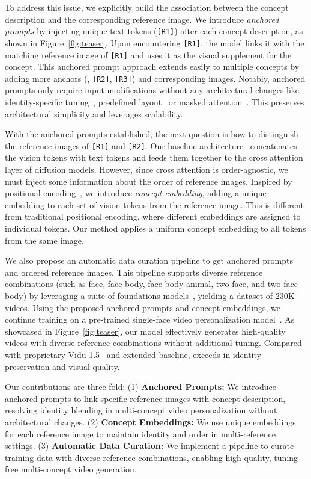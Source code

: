 To address this issue, we explicitly build the association between the concept description and the corresponding reference image. 
We introduce \emph{anchored prompts} by injecting unique text tokens (\texttt{[R1]}) after each concept description, as shown in Figure~\ref{fig:teaser}.
Upon encountering \texttt{[R1]}, the model links it with the matching reference image of \texttt{[R1]} and uses it as the visual supplement for the concept.
This anchored prompt approach extends easily to multiple concepts by adding more anchors (\eg, \texttt{[R2]}, \texttt{[R3]}) and corresponding images.
Notably, anchored prompts only require input modifications without any architectural changes like identity-specific tuning~\cite{kumari2023multi,kwon2024concept}, predefined layout~\cite{liu2023cones,gu2024mix} or masked attention~\cite{xiao2024fastcomposer,kim2024instantfamily,he2024uniportrait,ostashev2024moa}. 
This preserves architectural simplicity and leverages scalability.

With the anchored prompts established, the next question is how to distinguish the reference images of \texttt{[R1]} and \texttt{[R2]}.
Our baseline architecture~\cite{he2024id,jiang2024videobooth,moviegen} concatenates the vision tokens with text tokens and feeds them together to the cross attention layer of diffusion models.
However, since cross attention is order-agnostic, we must inject some information about the order of reference images.
Inspired by positional encoding~\cite{vaswani2017attention,dosovitskiy2020image}, we introduce \emph{concept embedding}, adding a unique embedding to each set of vision tokens from the reference image.
This is different from traditional positional encoding, where different embeddings are assigned to individual tokens. Our method applies a uniform concept embedding to all tokens from the same image.

We also propose an automatic data curation pipeline to get anchored prompts and ordered reference images.
This pipeline supports diverse reference combinations (such as face, face-body, face-body-animal, two-face, and two-face-body) by leveraging a suite of foundations models~\cite{liu2023grounding,kirillov2023segment,radford2021learning,dubey2024llama}, yielding a dataset of 230K videos. 
Using the proposed anchored prompts and concept embeddings, we continue training \workname on a pre-trained single-face video personalization model~\cite{moviegen}. 
As showcased in Figure~\ref{fig:teaser}, our model effectively generates high-quality videos with diverse reference combinations without additional tuning. 
Compared with proprietary Vidu 1.5~\cite{vidustudio} and extended baseline, \workname exceeds in identity preservation and visual quality.

Our contributions are three-fold: (1) \textbf{Anchored Prompts:} We introduce anchored prompts to link specific reference images with concept description, resolving identity blending in multi-concept video personalization without architectural changes. (2) \textbf{Concept Embeddings:} We use unique embeddings for each reference image to maintain identity and order in multi-reference settings. (3) \textbf{Automatic Data Curation:} We implement a pipeline to curate training data with diverse reference combinations, enabling high-quality, tuning-free multi-concept video generation.